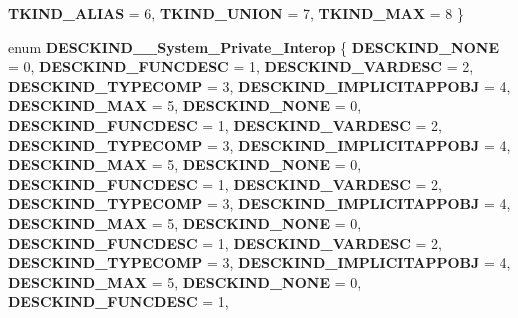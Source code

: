 \begin{DoxyCompactItemize}
{\bfseries T\+K\+I\+N\+D\+\_\+\+A\+L\+I\+AS} = 6, 
{\bfseries T\+K\+I\+N\+D\+\_\+\+U\+N\+I\+ON} = 7, 
\newline
{\bfseries T\+K\+I\+N\+D\+\_\+\+M\+AX} = 8
 \}
\item 
\mbox{\label{namespace_system_1_1_runtime_1_1_interop_services_1_1_com_types_aa5b48e3d71ce8cd59e7daf1cf1292fc6}} 
enum {\bfseries D\+E\+S\+C\+K\+I\+N\+D\+\_\+\+\_\+\+System\+\_\+\+Private\+\_\+\+Interop} \{ \newline
{\bfseries D\+E\+S\+C\+K\+I\+N\+D\+\_\+\+N\+O\+NE} = 0, 
{\bfseries D\+E\+S\+C\+K\+I\+N\+D\+\_\+\+F\+U\+N\+C\+D\+E\+SC} = 1, 
{\bfseries D\+E\+S\+C\+K\+I\+N\+D\+\_\+\+V\+A\+R\+D\+E\+SC} = 2, 
{\bfseries D\+E\+S\+C\+K\+I\+N\+D\+\_\+\+T\+Y\+P\+E\+C\+O\+MP} = 3, 
\newline
{\bfseries D\+E\+S\+C\+K\+I\+N\+D\+\_\+\+I\+M\+P\+L\+I\+C\+I\+T\+A\+P\+P\+O\+BJ} = 4, 
{\bfseries D\+E\+S\+C\+K\+I\+N\+D\+\_\+\+M\+AX} = 5, 
{\bfseries D\+E\+S\+C\+K\+I\+N\+D\+\_\+\+N\+O\+NE} = 0, 
{\bfseries D\+E\+S\+C\+K\+I\+N\+D\+\_\+\+F\+U\+N\+C\+D\+E\+SC} = 1, 
\newline
{\bfseries D\+E\+S\+C\+K\+I\+N\+D\+\_\+\+V\+A\+R\+D\+E\+SC} = 2, 
{\bfseries D\+E\+S\+C\+K\+I\+N\+D\+\_\+\+T\+Y\+P\+E\+C\+O\+MP} = 3, 
{\bfseries D\+E\+S\+C\+K\+I\+N\+D\+\_\+\+I\+M\+P\+L\+I\+C\+I\+T\+A\+P\+P\+O\+BJ} = 4, 
{\bfseries D\+E\+S\+C\+K\+I\+N\+D\+\_\+\+M\+AX} = 5, 
\newline
{\bfseries D\+E\+S\+C\+K\+I\+N\+D\+\_\+\+N\+O\+NE} = 0, 
{\bfseries D\+E\+S\+C\+K\+I\+N\+D\+\_\+\+F\+U\+N\+C\+D\+E\+SC} = 1, 
{\bfseries D\+E\+S\+C\+K\+I\+N\+D\+\_\+\+V\+A\+R\+D\+E\+SC} = 2, 
{\bfseries D\+E\+S\+C\+K\+I\+N\+D\+\_\+\+T\+Y\+P\+E\+C\+O\+MP} = 3, 
\newline
{\bfseries D\+E\+S\+C\+K\+I\+N\+D\+\_\+\+I\+M\+P\+L\+I\+C\+I\+T\+A\+P\+P\+O\+BJ} = 4, 
{\bfseries D\+E\+S\+C\+K\+I\+N\+D\+\_\+\+M\+AX} = 5, 
{\bfseries D\+E\+S\+C\+K\+I\+N\+D\+\_\+\+N\+O\+NE} = 0, 
{\bfseries D\+E\+S\+C\+K\+I\+N\+D\+\_\+\+F\+U\+N\+C\+D\+E\+SC} = 1, 
\newline
{\bfseries D\+E\+S\+C\+K\+I\+N\+D\+\_\+\+V\+A\+R\+D\+E\+SC} = 2, 
{\bfseries D\+E\+S\+C\+K\+I\+N\+D\+\_\+\+T\+Y\+P\+E\+C\+O\+MP} = 3, 
{\bfseries D\+E\+S\+C\+K\+I\+N\+D\+\_\+\+I\+M\+P\+L\+I\+C\+I\+T\+A\+P\+P\+O\+BJ} = 4, 
{\bfseries D\+E\+S\+C\+K\+I\+N\+D\+\_\+\+M\+AX} = 5, 
\newline
{\bfseries D\+E\+S\+C\+K\+I\+N\+D\+\_\+\+N\+O\+NE} = 0, 
{\bfseries D\+E\+S\+C\+K\+I\+N\+D\+\_\+\+F\+U\+N\+C\+D\+E\+SC} = 1, 

\end{DoxyCompactItemize}
